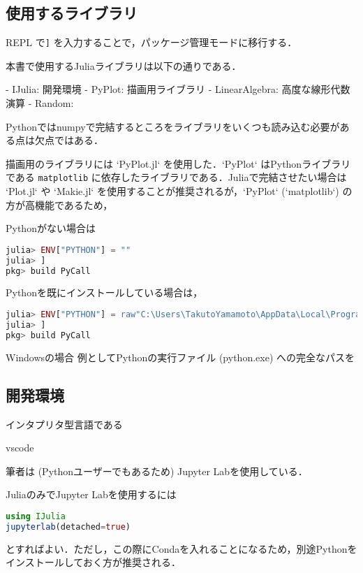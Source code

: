 \documentclass[titlepage]{ltjsbook}
\newcommand{\jl}{\lstinline[language=julia]}
\begin{document}
\subsection{使用するライブラリ}

REPL
で\jl{]} を入力することで，パッケージ管理モードに移行する．

本書で使用するJuliaライブラリは以下の通りである．

- IJulia: 開発環境
- PyPlot: 描画用ライブラリ
- LinearAlgebra: 高度な線形代数演算
- Random: 

Pythonではnumpyで完結するところをライブラリをいくつも読み込む必要がある点は欠点ではある．

描画用のライブラリには `PyPlot.jl` を使用した．`PyPlot` はPythonライブラリである \jl{matplotlib} に依存したライブラリである．Juliaで完結させたい場合は `Plot.jl` や `Makie.jl` を使用することが推奨されるが，`PyPlot` (`matplotlib`) の方が高機能であるため，

Pythonがない場合は

\begin{lstlisting}[language=julia]
julia> ENV["PYTHON"] = ""
julia> ]
pkg> build PyCall
\end{lstlisting}

Pythonを既にインストールしている場合は，

\begin{lstlisting}[language=julia]
julia> ENV["PYTHON"] = raw"C:\Users\TakutoYamamoto\AppData\Local\Programs\Python\Python312\python.exe"
julia> ]
pkg> build PyCall
\end{lstlisting}

Windowsの場合
例としてPythonの実行ファイル (python.exe) への完全なパスを


\subsection{開発環境}

インタプリタ型言語である

vscode

筆者は (Pythonユーザーでもあるため) Jupyter Labを使用している．

JuliaのみでJupyter Labを使用するには

\begin{lstlisting}[language=julia]
using IJulia
jupyterlab(detached=true)
\end{lstlisting}

とすればよい．ただし，この際にCondaを入れることになるため，別途Pythonをインストールしておく方が推奨される．
\end{document}
